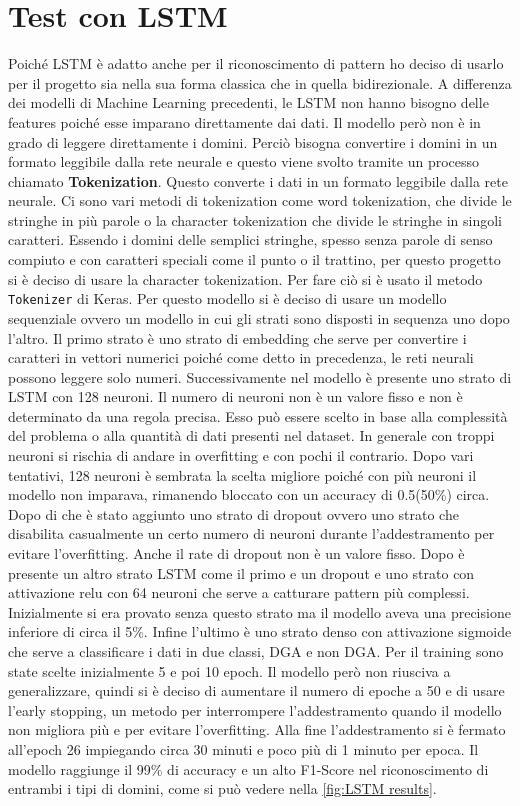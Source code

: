 \documentclass[12pt,a4paper,openright,twoside]{book}
\begin{document}
\section{Test con LSTM}
Poiché LSTM è adatto anche per il riconoscimento di pattern
ho deciso di usarlo per il progetto sia nella sua forma classica che in quella bidirezionale.
A differenza dei modelli di Machine Learning precedenti,
le LSTM non hanno bisogno delle features poiché esse imparano direttamente dai dati.
Il modello però non è in grado di leggere direttamente i domini.
Perciò bisogna convertire i domini in un formato leggibile dalla rete neurale e questo viene
svolto tramite un processo chiamato \textbf{Tokenization}.
Questo converte i dati in un formato leggibile dalla rete neurale.
Ci sono vari metodi di tokenization come word tokenization, che divide 
le stringhe in più parole o la character tokenization
che divide le stringhe in singoli caratteri. Essendo i domini delle semplici stringhe,
spesso senza parole di senso compiuto e con caratteri speciali come il punto o il trattino,
per questo progetto si è deciso di usare la character tokenization.
Per fare ciò si è usato il metodo \texttt{Tokenizer} di Keras.
Per questo modello si è deciso di usare
un modello sequenziale ovvero un modello in cui gli
strati sono disposti in sequenza uno dopo l'altro. \hfil \break
Il primo strato è uno strato di embedding che serve 
per convertire i caratteri in vettori numerici poiché
come detto in precedenza, le reti neurali
possono leggere solo numeri. \hfil \break
Successivamente nel modello è presente uno strato di LSTM
con 128 neuroni. Il numero di neuroni non 
è un valore fisso e non è determinato da una regola precisa.
Esso può essere scelto in base
alla complessità del problema o alla quantità di dati
presenti nel dataset. In generale con troppi neuroni si rischia di
andare in overfitting e con pochi il contrario. Dopo
vari tentativi, 128 neuroni è sembrata la scelta migliore poiché
con più neuroni il modello non imparava, rimanendo bloccato con un accuracy di 0.5(50\%) circa. \hfil \break
Dopo di che è stato aggiunto uno strato di dropout
ovvero uno strato che disabilita casualmente
un certo numero di neuroni durante l'addestramento 
per evitare l'overfitting. Anche il rate di dropout non
è un valore fisso.
Dopo è presente un altro strato LSTM come il primo e un dropout
e uno strato con attivazione relu con 64 neuroni che serve
a catturare pattern più complessi. Inizialmente
si era provato senza questo strato ma 
il modello aveva una precisione inferiore di circa il 5\%. Infine
l'ultimo è uno strato denso con attivazione sigmoide
che serve a classificare i dati in due classi, DGA e non DGA.
Per il training sono state scelte inizialmente 5 e poi 10 epoch.
Il modello però non riusciva a generalizzare, quindi si è deciso di aumentare
il numero di epoche a 50 e di usare l'early stopping, un metodo per interrompere
l'addestramento quando il modello non migliora più e per evitare l'overfitting. Alla
fine l'addestramento si è fermato all'epoch 26 impiegando circa 30 minuti e poco più di 1 minuto per epoca.
Il modello raggiunge il 99\% di accuracy e un alto F1-Score nel riconoscimento di entrambi i tipi di domini,
come si può vedere nella \cref{fig:LSTM results}.
\end{document}
